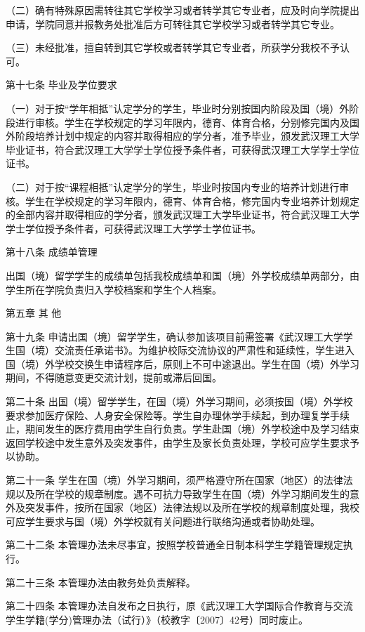 \documentclass[UTF8,12pt,a4paper]{report}
\begin{document}
（二）确有特殊原因需转往其它学校学习或者转学其它专业者，应及时向学院提出申请，学院同意并报教务处批准后方可转往其它学校学习或者转学其它专业。

（三）未经批准，擅自转到其它学校或者转学其它专业者，所获学分我校不予认可。

第十七条 毕业及学位要求

（一）对于按“学年相抵”认定学分的学生，毕业时分别按国内阶段及国（境）外阶段进行审核。学生在学校规定的学习年限内，德育、体育合格，分别修完国内及国外阶段培养计划中规定的内容并取得相应的学分者，准予毕业，颁发武汉理工大学毕业证书，符合武汉理工大学学士学位授予条件者，可获得武汉理工大学学士学位证书。

（二）对于按“课程相抵”认定学分的学生，毕业时按国内专业的培养计划进行审核。学生在学校规定的学习年限内，德育、体育合格，修完国内专业培养计划规定的全部内容并取得相应的学分者，颁发武汉理工大学毕业证书，符合武汉理工大学学士学位授予条件者，可获得武汉理工大学学士学位证书。

第十八条 成绩单管理

出国（境）留学学生的成绩单包括我校成绩单和国（境）外学校成绩单两部分，由学生所在学院负责归入学校档案和学生个人档案。

第五章 其 他

第十九条 申请出国（境）留学学生，确认参加该项目前需签署《武汉理工大学学生国（境）交流责任承诺书》。为维护校际交流协议的严肃性和延续性，学生进入国（境）外学校交换生申请程序后，原则上不可中途退出。学生在国（境）外学习期间，不得随意变更交流计划，提前或滞后回国。

第二十条 出国（境）留学学生，在国（境）外学习期间，必须按国（境）外学校要求参加医疗保险、人身安全保险等。学生自办理休学手续起，到办理复学手续止，期间发生的医疗费用由学生自行负责。学生赴国（境）外学校途中及学习结束返回学校途中发生意外及突发事件，由学生及家长负责处理，学校可应学生要求予以协助。

第二十一条 学生在国（境）外学习期间，须严格遵守所在国家（地区）的法律法规以及所在学校的规章制度。遇不可抗力导致学生在国（境）外学习期间发生的意外及突发事件，按所在国家（地区）法律法规以及所在学校的规章制度处理，我校可应学生要求与国（境）外学校就有关问题进行联络沟通或者协助处理。

第二十二条 本管理办法未尽事宜，按照学校普通全日制本科学生学籍管理规定执行。

第二十三条 本管理办法由教务处负责解释。

第二十四条 本管理办法自发布之日执行，原《武汉理工大学国际合作教育与交流学生学籍(学分)管理办法（试行）》（校教字〔2007〕42号）同时废止。
\end{document}

